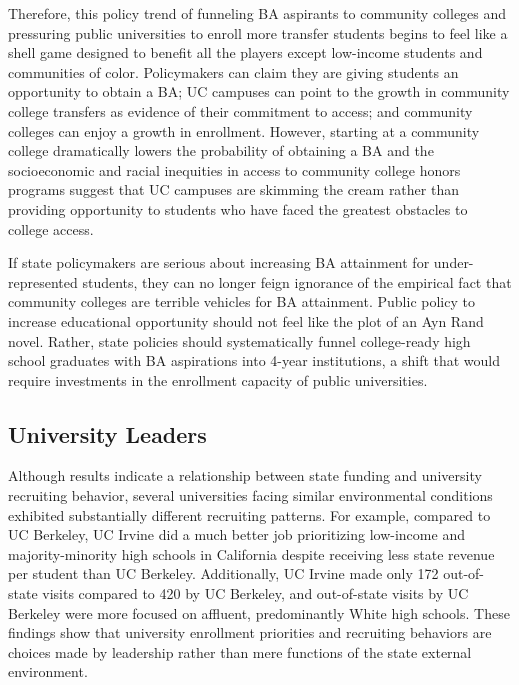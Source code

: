 \documentclass[twoside]{article}
\begin{document}
Therefore, this policy trend of funneling BA aspirants to community colleges and pressuring public universities to enroll more transfer students begins to feel like a shell game designed to benefit all the players except low-income students and communities of color. Policymakers can claim they are giving students an opportunity to obtain a BA; UC campuses can point to the growth in community college transfers as evidence of their commitment to access; and community colleges can enjoy a growth in enrollment. However, starting at a community college dramatically lowers the probability of obtaining a BA and the socioeconomic and racial inequities in access to community college honors programs suggest that UC campuses are skimming the cream rather than providing opportunity to students who have faced the greatest obstacles to college access.

If state policymakers are serious about increasing BA attainment for under-represented students, they can no longer feign ignorance of the empirical fact that community colleges are terrible vehicles for BA attainment. Public policy to increase educational opportunity should not feel like the plot of an Ayn Rand novel. Rather, state policies should systematically funnel college-ready high school graduates with BA aspirations into 4-year institutions, a shift that would require investments in the enrollment capacity of public universities.

\subsection*{University Leaders}

Although results indicate a relationship between state funding and university recruiting behavior, several universities facing similar environmental conditions exhibited substantially different recruiting patterns. For example, compared to UC Berkeley, UC Irvine did a much better job prioritizing low-income and majority-minority high schools in California despite receiving less state revenue per student than UC Berkeley. Additionally, UC Irvine made only 172 out-of-state visits compared to 420 by UC Berkeley, and out-of-state visits by UC Berkeley were more focused on affluent, predominantly White high schools.  These findings show that university enrollment priorities and recruiting behaviors are choices made by leadership rather than mere functions of the state external environment.
\end{document}
